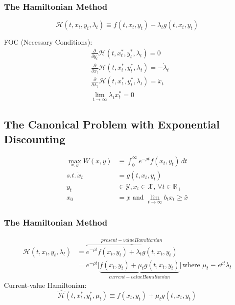 \subsubsection{The Hamiltonian Method}

\[
    \mathcal{H}(t,x_t,y_t,\lambda_t) \equiv f(t,x_t,y_t) + \lambda_t g(t,x_t,y_t)
\]

FOC (Necessary Conditions): \begin{align}
     & \frac{\partial }{\partial y_t}\mathcal{H}(t,x_t^*, y_t^*, \lambda_t) = 0                \\
     & \frac{\partial }{\partial x_t}\mathcal{H}(t,x_t^*, y_t^*, \lambda_t) = -\dot{\lambda}_t \\
     & \frac{\partial }{\partial \lambda_t}\mathcal{H}(t,x_t^*, y_t^*,\lambda_t) = \dot{x}_t   \\
     & \lim_{t \to \infty} \lambda_tx_t^* = 0
\end{align}

\subsection{The Canonical Problem with Exponential Discounting}

\begin{align}
    \max_{x,y} W(x,y) & \equiv \int_{0}^{\infty } e^{-\rho t} f(x_t,y_t) \, dt              \\
    s.t. \, \dot{x}_t & = g(t,x_t,y_t)                                                      \\
    y_t               & \in \mathcal{Y}, x_t \in \mathcal{X}, \, \forall t \in \mathbb{R}_+ \\
    x_0               & = \underbar{x} \text{ and } \lim_{t \to \infty} b_tx_t \geq \bar{x}
\end{align}

\subsubsection{The Hamiltonian Method}

\begin{align*}
    \mathcal{H}(t,x_t,y_t,\lambda_t) & = \overbrace{e^{-\rho t}f(x_t,y_t) + \lambda_t g(t,x_t,y_t)}^{present-value Hamiltonian}                                                           \\
                                     & = e^{-\rho t}\Big[\underbrace{f(x_t,y_t) + \mu_t g(t,x_t,y_t)}_{current-value Hamiltonian}\Big] \, \text{where } \mu_t \equiv e^{\rho t} \lambda_t
\end{align*}
Current-value Hamiltonian:
\[
    \hat{\mathcal{H}}(t,x_t^*, y_t^*, \mu_t) \equiv f(x_t,y_t) + \mu_t g(t,x_t,y_t)
\]

